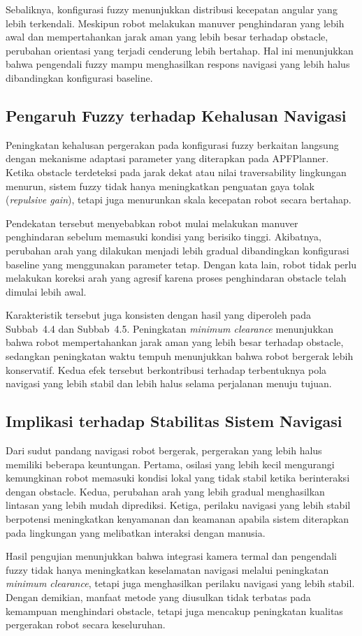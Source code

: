 Sebaliknya, konfigurasi fuzzy menunjukkan distribusi kecepatan angular yang lebih terkendali. Meskipun robot melakukan manuver penghindaran yang lebih awal dan mempertahankan jarak aman yang lebih besar terhadap obstacle, perubahan orientasi yang terjadi cenderung lebih bertahap. Hal ini menunjukkan bahwa pengendali fuzzy mampu menghasilkan respons navigasi yang lebih halus dibandingkan konfigurasi baseline.

\subsection{Pengaruh Fuzzy terhadap Kehalusan Navigasi}

Peningkatan kehalusan pergerakan pada konfigurasi fuzzy berkaitan langsung dengan me\-kanisme adaptasi parameter yang diterapkan pada APFPlanner. Ketika obstacle terdeteksi pada jarak dekat atau nilai traversability lingkungan menurun, sistem fuzzy tidak hanya meningkatk\-an penguatan gaya tolak (\textit{repulsive gain}), tetapi juga menurunkan skala kecepatan robot secara bertahap.

Pendekatan tersebut menyebabkan robot mulai melakukan manuver penghindaran sebelum memasuki kondisi yang berisiko tinggi. Akibatnya, perubahan arah yang dilakukan menjadi lebih gradual dibandingkan konfigurasi baseline yang menggunakan parameter tetap. Dengan kata lain, robot tidak perlu melakukan koreksi arah yang agresif karena proses penghindaran obstacle telah dimulai lebih awal.

Karakteristik tersebut juga konsisten dengan hasil yang diperoleh pada Subbab~4.4 dan Subbab~4.5. Peningkatan \textit{minimum clearance} menunjukkan bahwa robot mempertahankan jarak aman yang lebih besar terhadap obstacle, sedangkan peningkatan waktu tempuh menunjukkan bahwa robot bergerak lebih konservatif. Kedua efek tersebut berkontribusi terhadap terbentuknya pola navigasi yang lebih stabil dan lebih halus selama perjalanan menuju tujuan.

\subsection{Implikasi terhadap Stabilitas Sistem Navigasi}

Dari sudut pandang navigasi robot bergerak, pergerakan yang lebih halus memiliki beberapa keuntungan. Pertama, osilasi yang lebih kecil mengurangi kemungkinan robot memasuki kondisi lokal yang tidak stabil ketika berinteraksi dengan obstacle. Kedua, perubahan arah yang lebih gradual menghasilkan lintasan yang lebih mudah diprediksi. Ketiga, perilaku navigasi yang lebih stabil berpotensi meningkatkan kenyamanan dan keamanan apabila sistem diterapkan pada lingkungan yang melibatkan interaksi dengan manusia.

Hasil pengujian menunjukkan bahwa integrasi kamera termal dan pengendali fuzzy tidak hanya meningkatkan keselamatan navigasi melalui peningkatan \textit{minimum clearance}, tetapi juga menghasilkan perilaku navigasi yang lebih stabil. Dengan demikian, manfaat metode yang diusulkan tidak terbatas pada kemampuan menghindari obstacle, tetapi juga mencakup peningkatan kualitas pergerakan robot secara keseluruhan.
